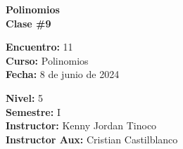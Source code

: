 \begin{center} \textbf
{
    \Large Polinomios \\ \vspace{2mm}Clase \#9
}
\end{center}

\begin{multicols}{2}
{
    \textbf{Encuentro:} 11\\
    \textbf{Curso:} Polinomios\\
    \textbf{Fecha:} 8 de junio de 2024\\
    \begin{flushright}
        \textbf{Nivel:} 5\\
        \textbf{Semestre:} I\\
        \textbf{Instructor:} Kenny Jordan Tinoco\\
        \textbf{Instructor Aux:} Cristian Castilblanco
    \end{flushright}
}
\end{multicols}

\thispagestyle{first-page-style}